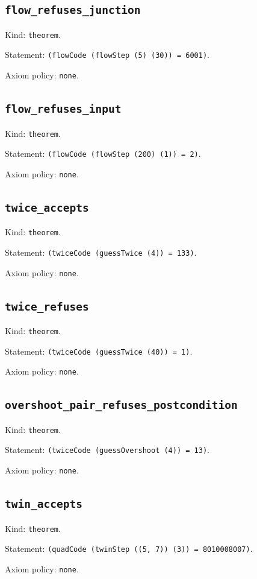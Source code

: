 \documentclass[11pt]{article}
\begin{document}
\subsection*{\texttt{flow\_refuses\_junction}}
\noindent Kind: \texttt{theorem}.\par
\noindent Statement: \texttt{(flowCode (flowStep (5) (30)) = 6001)}.\par
\noindent Axiom policy: \texttt{none}.\par
\subsection*{\texttt{flow\_refuses\_input}}
\noindent Kind: \texttt{theorem}.\par
\noindent Statement: \texttt{(flowCode (flowStep (200) (1)) = 2)}.\par
\noindent Axiom policy: \texttt{none}.\par
\subsection*{\texttt{twice\_accepts}}
\noindent Kind: \texttt{theorem}.\par
\noindent Statement: \texttt{(twiceCode (guessTwice (4)) = 133)}.\par
\noindent Axiom policy: \texttt{none}.\par
\subsection*{\texttt{twice\_refuses}}
\noindent Kind: \texttt{theorem}.\par
\noindent Statement: \texttt{(twiceCode (guessTwice (40)) = 1)}.\par
\noindent Axiom policy: \texttt{none}.\par
\subsection*{\texttt{overshoot\_pair\_refuses\_postcondition}}
\noindent Kind: \texttt{theorem}.\par
\noindent Statement: \texttt{(twiceCode (guessOvershoot (4)) = 13)}.\par
\noindent Axiom policy: \texttt{none}.\par
\subsection*{\texttt{twin\_accepts}}
\noindent Kind: \texttt{theorem}.\par
\noindent Statement: \texttt{(quadCode (twinStep ((5, 7)) (3)) = 8010008007)}.\par
\noindent Axiom policy: \texttt{none}.\par
\end{document}
